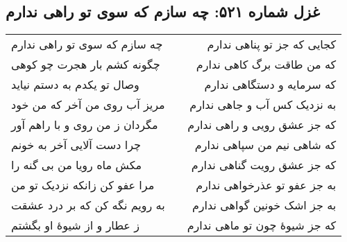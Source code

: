 \begin{center}
\section*{غزل شماره ۵۲۱: چه سازم که سوی تو راهی ندارم}
\label{sec:521}
\begin{longtable}{l p{0.5cm} r}
چه سازم که سوی تو راهی ندارم
&&
کجایی که جز تو پناهی ندارم
\\
چگونه کشم بار هجرت چو کوهی
&&
که من طاقت برگ کاهی ندارم
\\
وصال تو یکدم به دستم نیاید
&&
که سرمایه و دستگاهی ندارم
\\
مریز آب روی من آخر که من خود
&&
به نزدیک کس آب و جاهی ندارم
\\
مگردان ز من روی و با راهم آور
&&
که جز عشق رویی و راهی ندارم
\\
چرا دست آلایی آخر به خونم
&&
که شاهی نیم من سپاهی ندارم
\\
مکش ماه رویا من بی گنه را
&&
که جز عشق رویت گناهی ندارم
\\
مرا عفو کن زانکه نزدیک تو من
&&
به جز عفو تو عذرخواهی ندارم
\\
به رویم نگه کن که بر درد عشقت
&&
به جز اشک خونین گواهی ندارم
\\
ز عطار و از شیوهٔ او بگشتم
&&
که جز شیوهٔ چون تو ماهی ندارم
\\
\end{longtable}
\end{center}
